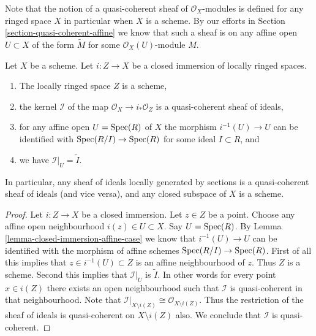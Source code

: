 \medskip\noindent
Note that the notion of a quasi-coherent sheaf of $\mathcal{O}_X$-modules
is defined for any ringed space $X$ in particular when $X$ is a scheme.
By our efforts in Section \ref{section-quasi-coherent-affine} we
know that such a sheaf is on any affine open $U \subset X$
of the form $\widetilde M$ for some $\mathcal{O}_X(U)$-module $M$.

\begin{lemma}
\label{lemma-closed-subspace-scheme}
Let $X$ be a scheme. Let $i : Z \to X$ be a closed immersion
of locally ringed spaces.
\begin{enumerate}
\item The locally ringed space $Z$ is a scheme,
\item the kernel $\mathcal{I}$ of the map
$\mathcal{O}_X \to i_*\mathcal{O}_Z$ is a quasi-coherent
sheaf of ideals,
\item for any affine open $U = \mathop{\mathrm{Spec}}(R)$ of $X$
the morphism $i^{-1}(U) \to U$ can be identified with
$\mathop{\mathrm{Spec}}(R/I) \to \mathop{\mathrm{Spec}}(R)$ for some ideal $I \subset R$, and
\item we have $\mathcal{I}|_U = \widetilde I$.
\end{enumerate}
In particular, any sheaf of ideals locally generated by sections
is a quasi-coherent sheaf of ideals (and vice versa),
and any closed subspace of $X$ is a scheme.
\end{lemma}

\begin{proof}
Let $i : Z \to X$ be a closed immersion.
Let $z \in Z$ be a point. Choose any affine open
neighbourhood $i(z) \in U \subset X$. Say $U = \mathop{\mathrm{Spec}}(R)$.
By Lemma \ref{lemma-closed-immersion-affine-case} we know
that $i^{-1}(U) \to U$ can be identified with the morphism
of affine schemes $\mathop{\mathrm{Spec}}(R/I) \to \mathop{\mathrm{Spec}}(R)$.
First of all this implies that $z \in i^{-1}(U) \subset Z$ is an
affine neighbourhood of $z$. Thus $Z$ is a scheme. Second
this implies that $\mathcal{I}|_U$ is $\widetilde I$.
In other words for every point $x \in i(Z)$ there exists an
open neighbourhood such that $\mathcal{I}$ is quasi-coherent in
that neighbourhood. Note that $\mathcal{I}|_{X \setminus i(Z)}
\cong \mathcal{O}_{X \setminus i(Z)}$. Thus the restriction
of the sheaf of ideals is quasi-coherent on $X \setminus i(Z)$
also. We conclude that $\mathcal{I}$ is quasi-coherent.
\end{proof}

